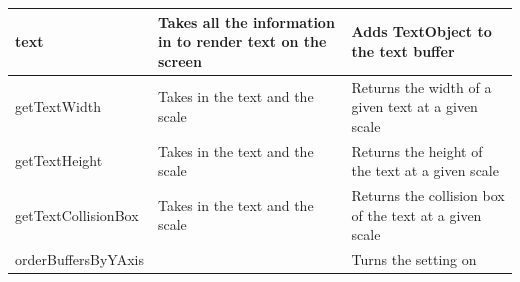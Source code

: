 \documentclass{article}
\begin{document}
\begin{center}
\begin{tabular}{ | m{} | m{}| m{} | }
                        \hline
                        text & Takes all the information in to render text on the screen & Adds TextObject to the text buffer\\
                        \hline
                        getTextWidth & Takes in the text and the scale & Returns the width of a given text at a given scale \\
                        \hline
                        getTextHeight & Takes in the text and the scale & Returns the height of the text at a given scale \\
                        \hline
                        getTextCollisionBox & Takes in the text and the scale & Returns the collision box of the text at a given scale \\
                        \hline
                        orderBuffersByYAxis & & Turns the setting on \\
                        \hline
                    \end{tabular}
                \end{center}
            \clearpage
\end{document}
